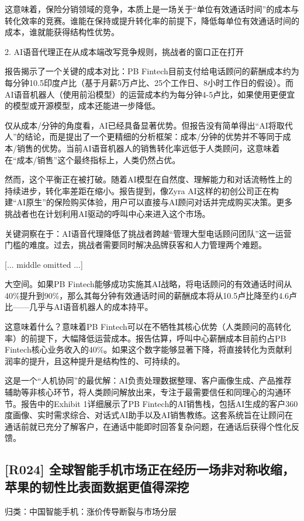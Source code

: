 \documentclass[11pt]{ctexart}
\begin{document}
这意味着，保险分销领域的竞争，本质上是一场关于“单位有效通话时间”的成本与转化效率的竞赛。谁能在保持或提升转化率的前提下，降低每单位有效通话时间的成本，谁就能获得结构性优势。

2. AI语音代理正在从成本端改写竞争规则，挑战者的窗口正在打开

报告揭示了一个关键的成本对比：PB Fintech目前支付给电话顾问的薪酬成本约为每分钟10.5印度卢比（基于月薪5万卢比、25个工作日、8小时工作日的假设）。而AI语音机器人（使用前沿模型）的运营成本约为每分钟4-5卢比，如果使用更便宜的模型或开源模型，成本还能进一步降低。

仅从成本/分钟的角度看，AI已经具备显著优势。但报告没有简单得出“AI将取代人”的结论，而是提出了一个更精细的分析框架：成本/分钟的优势并不等同于成本/销售的优势。当前AI语音机器人的销售转化率远低于人类顾问，这意味着在“成本/销售”这个最终指标上，人类仍然占优。

然而，这个平衡正在被打破。随着AI模型在自然度、理解能力和对话流畅性上的持续进步，转化率差距在缩小。报告提到，像Zyra AI这样的初创公司正在构建“AI原生”的保险购买体验，用户可以直接与AI顾问对话并完成购买决策。更多挑战者也在计划利用AI驱动的呼叫中心来进入这个市场。

关键洞察在于：AI语音代理降低了挑战者跨越“管理大型电话顾问团队”这一运营门槛的难度。过去，挑战者需要同时解决品牌获客和人力管理两个难题。

[... middle omitted ...]

大空间。如果PB Fintech能够成功实施其AI战略，将电话顾问的有效通话时间从40\%提升到90\%，那么其每分钟有效通话时间的薪酬成本将从10.5卢比降至约4.6卢比——几乎与AI语音机器人的成本持平。

这意味着什么？意味着PB Fintech可以在不牺牲其核心优势（人类顾问的高转化率）的前提下，大幅降低运营成本。报告估算，呼叫中心薪酬成本目前约占PB Fintech核心业务收入的40\%。如果这个数字能够显著下降，将直接转化为贡献利润率的提升，且这种提升是结构性的、可持续的。

这是一个“人机协同”的最优解：AI负责处理数据整理、客户画像生成、产品推荐辅助等非核心环节，将人类顾问解放出来，专注于最需要信任和同理心的沟通环节。报告中的Exhibit 1详细展示了PB Fintech的AI销售栈，包括AI生成的客户360度画像、实时需求综合、对话式AI助手以及AI销售教练。这套系统旨在让顾问在通话前就已充分了解客户，在通话中能即时回答复杂问题，在通话后获得个性化反馈。

\subsection{[R024] 全球智能手机市场正在经历一场非对称收缩，苹果的韧性比表面数据更值得深挖}
{\small\color{refgray}归类：中国智能手机：涨价传导断裂与市场分层}
\end{document}
